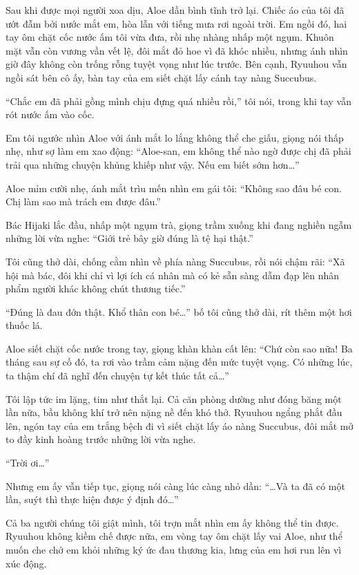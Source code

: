 \documentclass[../main.tex]{subfiles}
\begin{document}
\ct

Sau khi được mọi người xoa dịu, Aloe dần bình tĩnh trở lại. Chiếc áo của tôi đã ướt đẫm bởi nước mắt em, hòa lẫn với tiếng mưa rơi ngoài trời. Em ngồi đó, hai tay ôm chặt cốc nước ấm tôi vừa đưa, rồi nhẹ nhàng nhấp một ngụm. Khuôn mặt vẫn còn vương vần vết lệ, đôi mắt đỏ hoe vì đã khóc nhiều, nhưng ánh nhìn giờ đây không còn trống rỗng tuyệt vọng như lúc trước. Bên cạnh, Ryuuhou vẫn ngồi sát bên cô ấy, bàn tay của em siết chặt lấy cánh tay nàng Succubus.

``Chắc em đã phải gồng mình chịu đựng quá nhiều rồi,'' tôi nói, trong khi tay vẫn rót nước ấm vào cốc.

Em tôi ngước nhìn Aloe với ánh mắt lo lắng không thể che giấu, giọng nói thấp nhẹ, như sợ làm em xao động: ``Aloe-san, em không thể nào ngờ được chị đã phải trải qua những chuyện khủng khiếp như vậy. Nếu em biết sớm hơn\dots''

Aloe mỉm cười nhẹ, ánh mắt trìu mến nhìn em gái tôi: ``Không sao đâu bé con. Chị làm sao mà trách em được đâu.''

Bác Hijaki lắc đầu, nhấp một ngụm trà, giọng trầm xuống khi đang nghiền ngẫm những lời vừa nghe: ``Giới trẻ bây giờ đúng là tệ hại thật.''

Tôi cũng thở dài, chống cằm nhìn về phía nàng Succubus, rồi nói chậm rãi: ``Xã hội mà bác, đôi khi chỉ vì lợi ích cá nhân mà có kẻ sẵn sàng dẫm đạp lên nhân phẩm người khác không chút thương tiếc.''

``Đúng là đau đớn thật. Khổ thân con bé\dots'' bố tôi cũng thở dài, rít thêm một hơi thuốc lá.

Aloe siết chặt cốc nước trong tay, giọng khàn khàn cất lên: ``Chứ còn sao nữa! Ba tháng sau sự cố đó, ta rơi vào trầm cảm nặng đến mức tuyệt vọng. Có những lúc, ta thậm chí đã nghĩ đến chuyện tự kết thúc tất cả\dots''

Tôi lập tức im lặng, tim như thắt lại. Cả căn phòng dường như đóng băng một lần nữa, bầu không khí trở nên nặng nề đến khó thở. Ryuuhou ngẩng phắt đầu lên, ngón tay của em trắng bệch đi vì siết chặt lấy áo nàng Succubus, đôi mắt mở to đầy kinh hoàng trước những lời vừa nghe.

``Trời ơi\dots''

Nhưng em ấy vẫn tiếp tục, giọng nói càng lúc càng nhỏ dần: ``\dots Và ta đã có một lần, suýt thì thực hiện được ý định đó\dots''

Cả ba người chúng tôi giật mình, tôi trợn mắt nhìn em ấy không thể tin được. Ryuuhou không kiềm chế được nữa, em vòng tay ôm chặt lấy vai Aloe, như thể muốn che chở em khỏi những ký ức đau thương kia, lưng của em hơi run lên vì xúc động.
\end{document}
